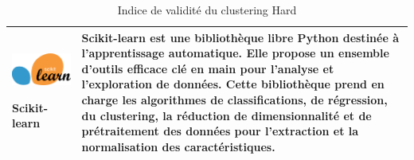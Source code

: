 \begin{table}[H]
\begin{tabular}{|m{5cm}|m{14cm}|}
  \begin{center}
    \begin{minipage}{.3\textwidth}
    \includegraphics[width=\textwidth]{images/chapitre7/scikit_learn.png}
  \end{minipage}
  \end{center}
  \centering \textbf{Scikit-learn} \cite{pedregosa2011scikit} & Scikit-learn est une bibliothèque libre Python destinée à l'apprentissage automatique. Elle propose un ensemble d'outils efficace clé en main pour l’analyse et l’exploration de données. Cette bibliothèque prend en charge les algorithmes de classifications, de régression, du clustering, la réduction de dimensionnalité et de prétraitement des données pour l'extraction et la normalisation des caractéristiques.  \\ \hline

  \end{tabular}
	\caption{Indice de validité du clustering Hard}
	\label{tools}
\end{table}

\newpage


